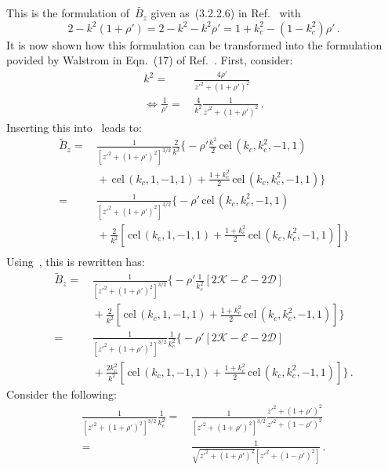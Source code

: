 This is the formulation of~$\tilde{B_z}$ given as~(3.2.2.6) in Ref.~\cite{teal} with
\begin{equation}
   2 - k^2(1 + \rho')
 = 2 - k^2 - k^2 \rho'
 = 1 + k_c^2 - (1 - k_c^2) \rho' \, .
\end{equation}
It is now shown how this formulation can be transformed into
the formulation povided by Walstrom in Eqn.~(17) of Ref.~\cite{walstrom_2017}.
First, consider:
\begin{align}
  k^2 =&\, \frac{4 \rho'}{z'^2 + (1+\rho')^2} \nonumber \\
  \Leftrightarrow
  \frac{1}{\rho'} =&\, \frac{4}{k^2} \frac{1}{z'^2 + (1+\rho')^2} \, .
\end{align}
Inserting this into~ leads to:
\begin{align}
 \tilde{B}_z
 =&\, \frac{1}{\left[z'^2 + (1 + \rho')^2\right]^{3/2}} \frac{2}{k^2} \Biggl\{
      -\rho' \frac{k^2}{2} \,\textrm{cel}\,(k_c, k_c^2, -1, 1) \nonumber \\
 ~&\, + \,\textrm{cel}\,(k_c, 1, -1, 1) + \frac{1 + k_c^2}{2} \,\textrm{cel}\,(k_c, k_c^2, -1, 1) \Biggr\} \nonumber \\
 =&\, \frac{1}{\left[z'^2 + (1 + \rho')^2\right]^{3/2}}  \Biggl\{
      -\rho' \,\textrm{cel}\,(k_c, k_c^2, -1, 1) \nonumber \\
 ~&\, + \frac{2}{k^2} \left[ \,\textrm{cel}\,(k_c, 1, -1, 1) + \frac{1 + k_c^2}{2} \,\textrm{cel}\,(k_c, k_c^2, -1, 1) \right] \Biggr\} \nonumber \\
\end{align}
Using~, this is rewritten has:
\begin{align}
 \tilde{B}_z
 =&\, \frac{1}{\left[z'^2 + (1 + \rho')^2\right]^{3/2}}  \Biggl\{
      -\rho' \frac{1}{k_c^2} \left[ 2 \mathcal{K} - \mathcal{E} - 2 \mathcal{D} \right] \nonumber \\
 ~&\, + \frac{2}{k^2} \left[ \,\textrm{cel}\,(k_c, 1, -1, 1) + \frac{1 + k_c^2}{2} \,\textrm{cel}\,(k_c, k_c^2, -1, 1) \right] \Biggr\} \label{eqn:cwl_B_z_intermediate} \\
 =&\, \frac{1}{\left[z'^2 + (1 + \rho')^2\right]^{3/2}} \frac{1}{k_c^2} \Biggl\{
      -\rho' \left[ 2 \mathcal{K} - \mathcal{E} - 2 \mathcal{D} \right] \nonumber \\
 ~&\, + \frac{2 k_c^2}{k^2} \left[ \,\textrm{cel}\,(k_c, 1, -1, 1) + \frac{1 + k_c^2}{2} \,\textrm{cel}\,(k_c, k_c^2, -1, 1) \right] \Biggr\} \, .
\end{align}
Consider the following:
\begin{align}
      \frac{1}{\left[z'^2 + (1 + \rho')^2\right]^{3/2}} \frac{1}{k_c^2}
 =&\, \frac{1}{\left[z'^2 + (1 + \rho')^2\right]^{3/2}} \frac{z'^2 + (1 + \rho')^2}{z'^2 + (1 - \rho')^2} \nonumber \\
 =&\, \frac{1}{\sqrt{z'^2 + (1 + \rho')^2} \left[z'^2 + (1 - \rho')^2\right]} \, .
\end{align}
